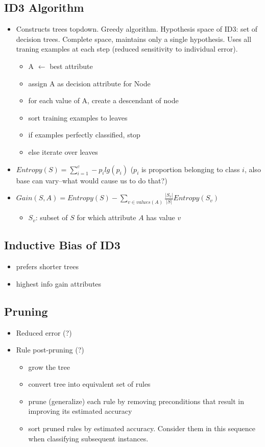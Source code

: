 \documentclass[11pt]{article}
\begin{document}
\subsection{ID3 Algorithm}
\begin{itemize}
\item Constructs trees topdown. Greedy algorithm. Hypothesis space of ID3: set of decision trees. Complete space, maintains only a single hypothesis. Uses all traning examples at each step (reduced sensitivity to individual error).
\begin{itemize}
\item A $\leftarrow$ best attribute
\item assign A as decision attribute for Node
\item for each value of A, create a descendant of node
\item sort training examples to leaves
\item if examples perfectly classified, stop
\item else iterate over leaves
\end{itemize}
\item $Entropy(S) = \sum_{i=1}^{c} -p_i lg(p_i)$ ($p_i$ is proportion belonging to class $i$, also base can vary--what would cause us to do that?)
\item $Gain(S,A) = Entropy(S) - \sum_{v \in values(A)} \frac{|S_v|}{|S|} Entropy(S_v)$
\begin{itemize}
\item $S_v$: subset of $S$ for which attribute $A$ has value $v$
\end{itemize}
\end{itemize}

\subsection{Inductive Bias of ID3}
\begin{itemize}
\item prefers shorter trees
\item highest info gain attributes
\end{itemize}

\subsection{Pruning}
\begin{itemize}
\item Reduced error  (?)
\item Rule post-pruning (?)
\begin{itemize}
\item grow the tree
\item convert tree into equivalent set of rules
\item prune (generalize) each rule by removing preconditions that result in improving its estimated accuracy
\item sort pruned rules by estimated accuracy. Consider them in this sequence when classifying subsequent instances.
\end{itemize}
\end{itemize}
\end{document}
